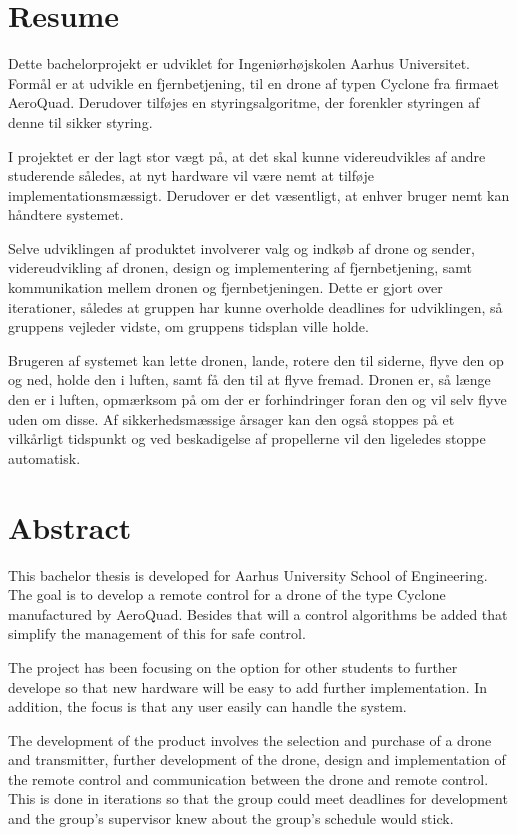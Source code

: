 \documentclass[Main]{subfiles}
\begin{document}
\chapter*{Resume}

Dette bachelorprojekt er udviklet for Ingeniørhøjskolen Aarhus Universitet. 
Formål er at udvikle en fjernbetjening, til en drone af typen Cyclone fra firmaet AeroQuad. 
Derudover tilføjes en styringsalgoritme, der forenkler styringen af denne til sikker styring.

I projektet er der lagt stor vægt på, at det skal kunne videreudvikles af andre studerende således, at nyt hardware vil være nemt at tilføje implementationsmæssigt.
Derudover er det væsentligt, at enhver bruger nemt kan håndtere systemet.

Selve udviklingen af produktet involverer valg og indkøb af drone og sender, videreudvikling af dronen, design og implementering af fjern\-betjening, samt kommunikation mellem dronen og fjernbetjeningen.
Dette er gjort over iterationer, således at gruppen har kunne overholde deadlines for udviklingen, så gruppens vejleder vidste, om gruppens tidsplan ville holde.

Brugeren af systemet kan lette dronen, lande, rotere den til siderne, flyve den op og ned, holde den i luften, samt få den til at flyve fremad.
Dronen er, så længe den er i luften, opmærksom på om der er forhindringer foran den og vil  selv flyve uden om disse.
Af sikkerhedsmæssige årsager kan den også stoppes på et vilkårligt tidspunkt og ved beskadigelse af propellerne vil den ligeledes stoppe automatisk.




\chapter*{Abstract}

This bachelor thesis is developed for Aarhus University School of Engineering.
The goal is to develop a remote control for a drone of the type Cyclone manufactured by AeroQuad. 
Besides that will a control algorithms be added that simplify the management of this for safe control.

The project has been focusing on the option for other students to further develope so that new hardware will be easy to add further implementation.
In addition, the focus is that any user easily can handle the system.

The development of the product involves the selection and purchase of a drone and transmitter, further development of the drone, design and implementation of the remote control and communication between the drone and remote control.
This is done in iterations so that the group could meet deadlines for development and the group's supervisor knew about the group's schedule would stick.
\end{document}
